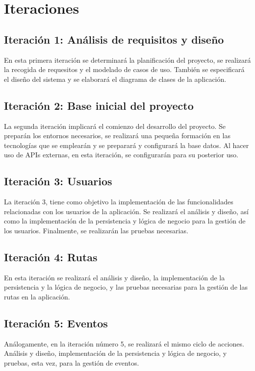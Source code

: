 \section{Iteraciones}
\subsection{Iteración 1: Análisis de requisitos y diseño}

En esta primera iteración se determinará la planificación del proyecto, se realizará la recogida de requesitos y el modelado de casos de uso. También se especificará el diseño del sistema y se elaborará el diagrama de clases de la aplicación.


\subsection{Iteración 2: Base inicial del proyecto}
La segunda iteración implicará el comienzo del desarrollo del proyecto. Se preparán los entornos necesarios, se realizará una pequeña formación en las tecnologías que se emplearán y se preparará y configurará la base datos. Al hacer uso de APIs externas, en esta iteración, se configurarán para su posterior uso.


\subsection{Iteración 3: Usuarios}
La iteración 3, tiene como objetivo la implementación de las funcionalidades relacionadas con los usuarios de la aplicación. Se realizará el análisis y diseño, así como la implementación de la persistencia y lógica de negocio para la gestión de los usuarios. Finalmente, se realizarán las pruebas necesarias.


\subsection{Iteración 4: Rutas}
En esta iteración se realizará el análisis y diseño, la implementación de la persistencia y la lógica de negocio, y las pruebas necesarias para la gestión de las rutas en la aplicación.


\subsection{Iteración 5: Eventos}
Análogamente, en la iteración número 5, se realizará el mismo ciclo de acciones. Análisis y diseño, implementación de la persistencia y lógica de negocio, y pruebas, esta vez, para la gestión de eventos.



